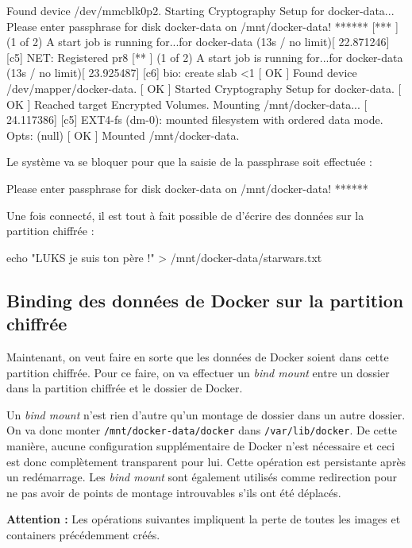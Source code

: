 \documentclass[11pt,a4paper,oneside]{report}
\newcommand{\code}[1]{\texttt{#1}}
\begin{document}
\begin{bashcode}
[  OK  ] Found device /dev/mmcblk0p2.
         Starting Cryptography Setup for docker-data...
Please enter passphrase for disk docker-data on /mnt/docker-data! ******
[***   ] (1 of 2) A start job is running for...for docker-data (13s / no limit)[   22.871246] [c5] NET: Registered pr8
[**    ] (1 of 2) A start job is running for...for docker-data (13s / no limit)[   23.925487] [c6] bio: create slab <1
[  OK  ] Found device /dev/mapper/docker-data.
[  OK  ] Started Cryptography Setup for docker-data.
[  OK  ] Reached target Encrypted Volumes.
         Mounting /mnt/docker-data...
[   24.117386] [c5] EXT4-fs (dm-0): mounted filesystem with ordered data mode. Opts: (null)
[  OK  ] Mounted /mnt/docker-data.
\end{bashcode}

Le système va se bloquer pour que la saisie de la passphrase soit effectuée :
\begin{bashcode}
Please enter passphrase for disk docker-data on /mnt/docker-data! ******
\end{bashcode}

Une fois connecté, il est tout à fait possible de d'écrire des données sur la partition chiffrée :
\begin{bashcode}
echo "LUKS je suis ton père !" > /mnt/docker-data/starwars.txt
\end{bashcode}


\subsection{Binding des données de Docker sur la partition chiffrée}
Maintenant, on veut faire en sorte que les données de Docker soient dans cette partition chiffrée. Pour ce faire, on va effectuer un \textit{bind mount} entre un dossier dans la partition chiffrée et le dossier de Docker.

Un \textit{bind mount} n'est rien d'autre qu'un montage de dossier dans un autre dossier. On va donc monter \code{/mnt/docker-data/docker} dans \code{/var/lib/docker}. De cette manière, aucune configuration supplémentaire de Docker n'est nécessaire et ceci est donc complètement transparent pour lui. Cette opération est persistante après un redémarrage. Les \textit{bind mount} sont également utilisés comme redirection pour ne pas avoir de points de montage introuvables s'ils ont été déplacés.

\textbf{Attention : } Les opérations suivantes impliquent la perte de toutes les images et containers précédemment créés.
\end{document}
